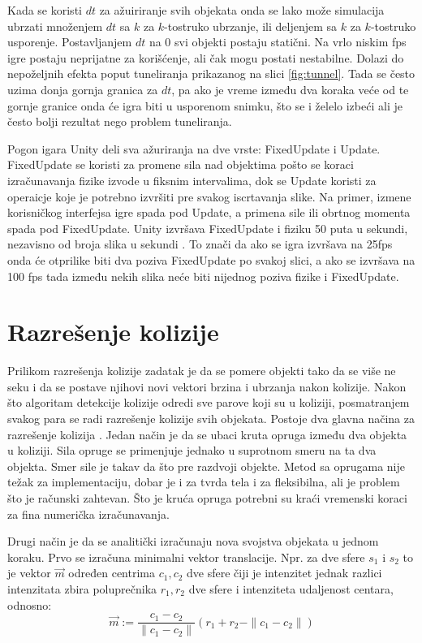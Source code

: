 \documentclass[12pt,oneside]{memoir}
\begin{document}
Kada se koristi $dt$ za ažuiriranje svih objekata onda se lako može simulacija ubrzati množenjem $dt$ 
sa $k$ za $k$-tostruko ubrzanje, ili deljenjem sa $k$ za $k$-tostruko usporenje. Postavljanjem $dt$ na 0 svi 
objekti postaju statični. 
Na vrlo niskim fps igre postaju neprijatne za korišćenje, ali čak mogu postati nestabilne. Dolazi do nepoželjnih efekta 
poput tuneliranja prikazanog na slici \ref{fig:tunnel}. Tada se često uzima donja gornja granica za $dt$, pa 
ako je vreme između dva koraka veće od te gornje granice onda će igra biti u usporenom snimku, što se i želelo izbeći 
ali je često bolji rezultat nego problem tuneliranja.

Pogon igara Unity deli sva ažuriranja na dve vrste: FixedUpdate i Update. 
FixedUpdate se koristi za promene sila nad objektima pošto se koraci izračunavanja fizike izvode u fiksnim intervalima, 
dok se Update koristi za operaicje koje je potrebno izvršiti pre svakog iscrtavanja slike. 
Na primer, izmene korisničkog interfejsa igre spada pod Update, a primena sile ili obrtnog momenta spada pod FixedUpdate.
Unity izvršava FixedUpdate i fiziku 50 puta u sekundi, nezavisno od broja slika u sekundi \cite{unity}.
To znači da ako se igra izvršava na 25fps onda će otprilike biti dva poziva FixedUpdate po svakoj slici,
a ako se izvršava na 100 fps tada između nekih slika neće biti nijednog poziva fizike i FixedUpdate.

\section{Razrešenje kolizije}

Prilikom razrešenja kolizije zadatak je da se pomere objekti tako da se više ne seku i
da se postave njihovi novi vektori brzina i ubrzanja nakon kolizije.
Nakon što algoritam detekcije kolizije odredi sve parove koji su u koliziji, 
posmatranjem svakog para se radi razrešenje kolizije svih objekata.
Postoje dva glavna načina za razrešenje kolizija \cite{Moore}.
Jedan način je da se ubaci kruta opruga između dva objekta u koliziji.
Sila opruge se primenjuje jednako u suprotnom smeru na ta dva objekta.
Smer sile je takav da što pre razdvoji objekte. Metod sa oprugama nije težak 
za implementaciju, dobar je i za tvrda tela i za fleksibilna, ali je problem što je 
računski zahtevan. Što je kruća opruga potrebni su kraći vremenski koraci za fina 
numerička izračunavanja.

Drugi način je da se analitički izračunaju nova svojstva objekata u jednom koraku.
Prvo se izračuna minimalni vektor translacije. Npr. za dve sfere $s_1$ i $s_2$ to je vektor $\vec{m}$
određen centrima $c_1, c_2$ dve sfere čiji je intenzitet jednak razlici intenzitata zbira poluprečnika
$r_1, r_2$ dve sfere i intenziteta udaljenost centara, odnosno:
\begin{equation}
	\label{eq:razresenje2}
	 \vec{m} := \frac{{c_1 - c_2}} {\|{c_1 - c_2}\|} 
	(r_1 + r_2 - \| {c_1 - c_2} \| ) 
\end{equation}
\end{document}
